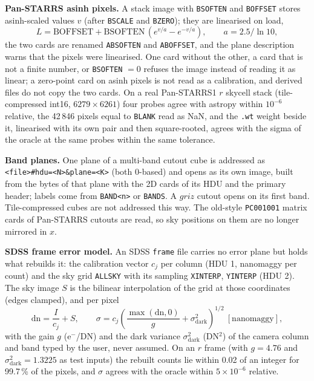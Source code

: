 \documentclass[11pt,a4paper]{article}
\newcommand{\code}[1]{\texttt{\small #1}}
\begin{document}
    \textbf{Pan-STARRS asinh pixels.} A stack image with \code{BSOFTEN} and \code{BOFFSET} stores asinh-scaled values $v$ (after \code{BSCALE} and \code{BZERO}); they are linearised on load,
    \begin{equation}
        L = \text{BOFFSET} + \text{BSOFTEN}\,\left(e^{v/a} - e^{-v/a}\right), \qquad a = 2.5/\ln 10,
    \end{equation}
    the two cards are renamed \code{ABSOFTEN} and \code{ABOFFSET}, and the plane description warns that the pixels were linearised. One card without the other, a card that is not a finite number, or \code{BSOFTEN} $= 0$ refuses the image instead of reading it as linear; a zero-point card on asinh pixels is not read as a calibration, and derived files do not copy the two cards. On a real Pan-STARRS1 $r$ skycell stack (tile-compressed int16, $6279 \times 6261$) four probes agree with astropy within $10^{-6}$ relative, the 42\,846 pixels equal to \code{BLANK} read as NaN, and the \code{.wt} weight beside it, linearised with its own pair and then square-rooted, agrees with the sigma of the oracle at the same probes within the same tolerance.

    \textbf{Band planes.} One plane of a multi-band cutout cube is addressed as \code{<file>\#hdu=<N>\&plane=<K>} (both 0-based) and opens as its own image, built from the bytes of that plane with the 2D cards of its HDU and the primary header; labels come from \code{BAND<n>} or \code{BANDS}. A $griz$ cutout opens on its first band. Tile-compressed cubes are not addressed this way. The old-style \code{PC001001} matrix cards of Pan-STARRS cutouts are read, so sky positions on them are no longer mirrored in $x$.

    \textbf{SDSS frame error model.} An SDSS \code{frame} file carries no error plane but holds what rebuilds it: the calibration vector $c_j$ per column (HDU 1, nanomaggy per count) and the sky grid \code{ALLSKY} with its sampling \code{XINTERP}, \code{YINTERP} (HDU 2). The sky image $S$ is the bilinear interpolation of the grid at those coordinates (edges clamped), and per pixel
    \begin{equation}
        \text{dn} = \frac{I}{c_j} + S, \qquad \sigma = c_j \left(\frac{\max(\text{dn}, 0)}{g} + \sigma_{\text{dark}}^2\right)^{1/2}\ [\text{nanomaggy}],
    \end{equation}
    with the gain $g$ (e$^-$/DN) and the dark variance $\sigma^2_{\text{dark}}$ (DN$^2$) of the camera column and band typed by the user, never assumed. On an $r$ frame (with $g = 4.76$ and $\sigma^2_{\text{dark}} = 1.3225$ as test inputs) the rebuilt counts lie within 0.02 of an integer for 99.7\,\% of the pixels, and $\sigma$ agrees with the oracle within $5 \times 10^{-6}$ relative.
\end{document}
